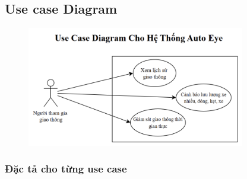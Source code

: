 \subsection{Use case Diagram}

\begin{figure}[H]
    \centering
    \includegraphics[width=0.85\textwidth]{image/usecase.png}

    \label{fig:usecase}
\end{figure}

\subsubsection{Đặc tả cho từng use case}

